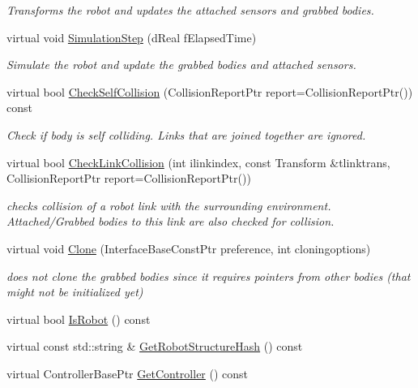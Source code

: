 \begin{DoxyCompactItemize}
\begin{DoxyCompactList}\small\item\em Transforms the robot and updates the attached sensors and grabbed bodies. \item\end{DoxyCompactList}\item 
virtual void \hyperlink{classOpenRAVE_1_1RobotBase_ab51d371d29d7947197b90d8e915de00f}{SimulationStep} (dReal fElapsedTime)
\begin{DoxyCompactList}\small\item\em Simulate the robot and update the grabbed bodies and attached sensors. \item\end{DoxyCompactList}\item 
virtual bool \hyperlink{classOpenRAVE_1_1RobotBase_a3d555222cf7b02d592a0a31cef5d479d}{CheckSelfCollision} (CollisionReportPtr report=CollisionReportPtr()) const 
\begin{DoxyCompactList}\small\item\em Check if body is self colliding. Links that are joined together are ignored. \item\end{DoxyCompactList}\item 
virtual bool \hyperlink{classOpenRAVE_1_1RobotBase_ac0f7aeb30af9069736ec789db0bf75d8}{CheckLinkCollision} (int ilinkindex, const Transform \&tlinktrans, CollisionReportPtr report=CollisionReportPtr())
\begin{DoxyCompactList}\small\item\em checks collision of a robot link with the surrounding environment. Attached/Grabbed bodies to this link are also checked for collision. \item\end{DoxyCompactList}\item 
\hypertarget{classOpenRAVE_1_1RobotBase_aadffdb83bc22dcdd5dd50c27d1bb5496}{
virtual void \hyperlink{classOpenRAVE_1_1RobotBase_aadffdb83bc22dcdd5dd50c27d1bb5496}{Clone} (InterfaceBaseConstPtr preference, int cloningoptions)}
\label{classOpenRAVE_1_1RobotBase_aadffdb83bc22dcdd5dd50c27d1bb5496}

\begin{DoxyCompactList}\small\item\em does not clone the grabbed bodies since it requires pointers from other bodies (that might not be initialized yet) \item\end{DoxyCompactList}\item 
virtual bool \hyperlink{classOpenRAVE_1_1RobotBase_a38fa8d57d2eefc36568411a129c741d3}{IsRobot} () const 
\item 
virtual const std::string \& \hyperlink{classOpenRAVE_1_1RobotBase_afe87e86a10bb78f6653dcd1a4558f07a}{GetRobotStructureHash} () const 
\item 
\hypertarget{classOpenRAVE_1_1RobotBase_a52ee62fc6defb50ff79a59e41d141566}{
virtual ControllerBasePtr \hyperlink{classOpenRAVE_1_1RobotBase_a52ee62fc6defb50ff79a59e41d141566}{GetController} () const }
\label{classOpenRAVE_1_1RobotBase_a52ee62fc6defb50ff79a59e41d141566}


\end{DoxyCompactItemize}
